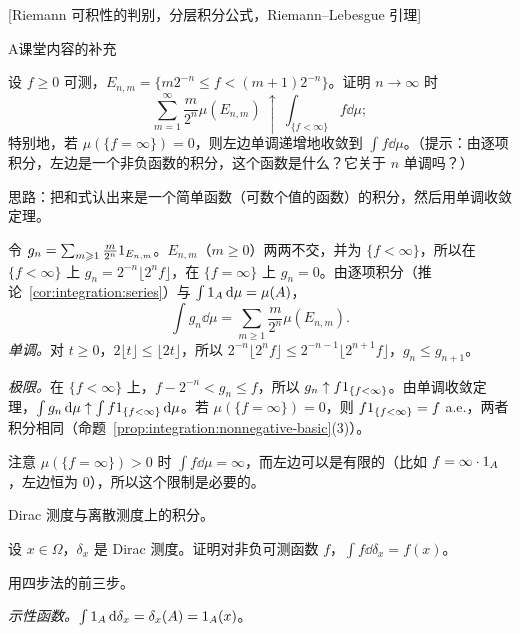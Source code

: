 [Riemann 可积性的判别，分层积分公式，Riemann–Lebesgue 引理]
\label{hw:integration}


\begin{exercises}{A}{课堂内容的补充}
\item\label{ex:integration:A1} 设 $f\geqslant0$ 可测，$E_{n,m}=\{m2^{-n}\leqslant f<(m+1)2^{-n}\}$。证明 $n\to\infty$ 时
\[
\sum_{m=1}^\infty\frac m{2^n}\mu(E_{n,m})\ \uparrow\ \int_{\{f<\infty\}}f\dd\mu ;
\]
特别地，若 $\mu(\{f=\infty\})=0$，则左边单调递增地收敛到 $\int f\dd\mu$。（提示：由逐项积分，左边是一个非负函数的积分，这个函数是什么？它关于 $n$ 单调吗？）
\begin{solution}
思路：把和式认出来是一个简单函数（可数个值的函数）的积分，然后用单调收敛定理。

令 $g_n=\sum_{m\geqslant1}\frac m{2^n}1_{E_{n,m}}$。$E_{n,m}$（$m\geqslant0$）两两不交，并为 $\{f<\infty\}$，所以在 $\{f<\infty\}$ 上 $g_n=2^{-n}\lfloor2^nf\rfloor$，在 $\{f=\infty\}$ 上 $g_n=0$。由逐项积分（推论~\ref{cor:integration:series}）与 $\int1_A\,\mathrm{d}\mu=\mu(A)$，
\[
\int g_n\dd\mu=\sum_{m\geqslant1}\frac m{2^n}\mu(E_{n,m}).
\]
\emph{单调。}对 $t\geqslant0$，$2\lfloor t\rfloor\leqslant\lfloor2t\rfloor$，所以 $2^{-n}\lfloor2^nf\rfloor\leqslant2^{-n-1}\lfloor2^{n+1}f\rfloor$，$g_n\leqslant g_{n+1}$。

\emph{极限。}在 $\{f<\infty\}$ 上，$f-2^{-n}<g_n\leqslant f$，所以 $g_n\uparrow f1_{\{f<\infty\}}$。由单调收敛定理，$\int g_n\,\mathrm{d}\mu\uparrow\int f1_{\{f<\infty\}}\,\mathrm{d}\mu$。若 $\mu(\{f=\infty\})=0$，则 $f1_{\{f<\infty\}}=f$ a.e.，两者积分相同（命题~\ref{prop:integration:nonnegative-basic}(3)）。

注意 $\mu(\{f=\infty\})>0$ 时 $\int f\dd\mu=\infty$，而左边可以是有限的（比如 $f=\infty\cdot1_A$，左边恒为 $0$），所以这个限制是必要的。
\end{solution}

\item\label{ex:integration:A2} Dirac 测度与离散测度上的积分。
\begin{questions}
\item 设 $x\in\Omega$，$\delta_x$ 是 Dirac 测度。证明对非负可测函数 $f$，$\int f\dd\delta_x=f(x)$。
\begin{solution}
用四步法的前三步。

\emph{示性函数。}$\int1_A\,\mathrm{d}\delta_x=\delta_x(A)=1_A(x)$。


\end{solution}
\end{questions}
\end{exercises}
